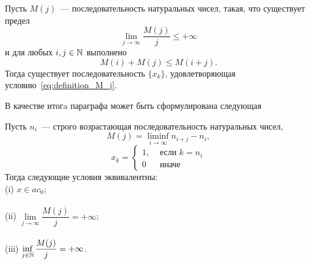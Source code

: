 \begin{hypothesis}
	Пусть $M(j)$~--- последовательность натуральных чисел, такая, что существует предел
	\begin{equation}
		\lim_{j\to\infty} \frac{M(j)}{j} \leq +\infty
	\end{equation}
	и для любых $i,j\in\mathbb{N}$ выполнено
	\begin{equation}
		M(i)+M(j) \leq M(i+j)
		.
	\end{equation}
	Тогда существует последовательность $\{x_k\}$,
	удовлетворяющая условию~\eqref{eq:definition_M_j}.
\end{hypothesis}

В качестве итогa параграфа может быть сформулирована следующая

\begin{theorem}
	\label{thm:M_j_ac0_inf_lim}
	Пусть $n_i$~--- строго возрастающая последовательность натуральных чисел,
	\begin{equation}
		\label{eq:definition_M_j}
		M(j) = \liminf_{i\to\infty} n_{i+j} - n_i,
	\end{equation}
	\begin{equation}
		x_k = \left\{\begin{array}{ll}
			1, & \mbox{~если~} k = n_i
			\\
			0  & \mbox{~иначе~}
		\end{array}\right.
	\end{equation}
	Тогда следующие условия эквивалентны:
	\\
	(i)   $x \in ac_0$;
	\\\\
	(ii)  $\lim\limits_{j \to \infty} \dfrac{M(j)}{j} = +\infty$;
	\\\\
	(iii) $\inf\limits_{j \in \mathbb{N}}     \dfrac{M(j)}{j} = +\infty$.
\end{theorem}
